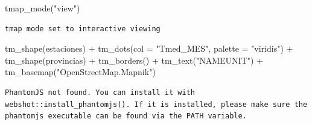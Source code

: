 \documentclass[
  letterpaper,
  DIV=11,
  numbers=noendperiod]{scrreprt}
\newenvironment{Shaded}{\begin{snugshade}}{\end{snugshade}}
\newcommand{\AttributeTok}[1]{\textcolor[rgb]{0.40,0.45,0.13}{#1}}
\newcommand{\FunctionTok}[1]{\textcolor[rgb]{0.28,0.35,0.67}{#1}}
\newcommand{\NormalTok}[1]{\textcolor[rgb]{0.00,0.23,0.31}{#1}}
\newcommand{\SpecialCharTok}[1]{\textcolor[rgb]{0.37,0.37,0.37}{#1}}
\newcommand{\StringTok}[1]{\textcolor[rgb]{0.13,0.47,0.30}{#1}}
\begin{document}
\begin{Shaded}
\begin{Highlighting}[]
\FunctionTok{tmap\_mode}\NormalTok{(}\StringTok{"view"}\NormalTok{)}
\end{Highlighting}
\end{Shaded}

\begin{verbatim}
tmap mode set to interactive viewing
\end{verbatim}

\begin{Shaded}
\begin{Highlighting}[]
\FunctionTok{tm\_shape}\NormalTok{(estaciones) }\SpecialCharTok{+}
    \FunctionTok{tm\_dots}\NormalTok{(}\AttributeTok{col =} \StringTok{"Tmed\_MES"}\NormalTok{, }\AttributeTok{palette =} \StringTok{"viridis"}\NormalTok{) }\SpecialCharTok{+}
\FunctionTok{tm\_shape}\NormalTok{(provincias) }\SpecialCharTok{+}
    \FunctionTok{tm\_borders}\NormalTok{() }\SpecialCharTok{+}
    \FunctionTok{tm\_text}\NormalTok{(}\StringTok{"NAMEUNIT"}\NormalTok{) }\SpecialCharTok{+}
    \FunctionTok{tm\_basemap}\NormalTok{(}\StringTok{"OpenStreetMap.Mapnik"}\NormalTok{)}
\end{Highlighting}
\end{Shaded}

\begin{verbatim}
PhantomJS not found. You can install it with webshot::install_phantomjs(). If it is installed, please make sure the phantomjs executable can be found via the PATH variable.
\end{verbatim}
\end{document}
